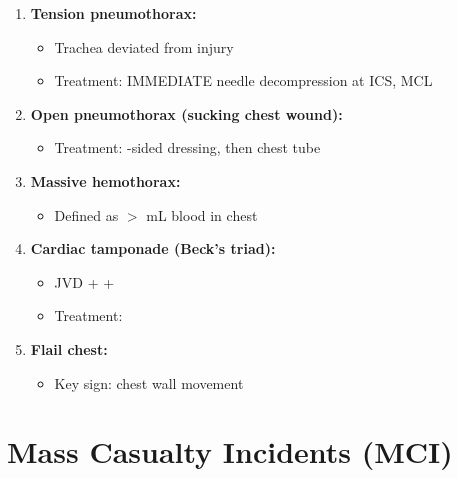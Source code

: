 \documentclass[11pt]{article}
\begin{document}
\begin{enumerate}
    \item \textbf{Tension pneumothorax:}
    \begin{itemize}
        \item Trachea deviated \underline{\hspace{2cm}} from injury
        \item Treatment: IMMEDIATE needle decompression at \underline{\hspace{2cm}} ICS, MCL
    \end{itemize}
    
    \item \textbf{Open pneumothorax (sucking chest wound):}
    \begin{itemize}
        \item Treatment: \underline{\hspace{2cm}}-sided dressing, then chest tube
    \end{itemize}
    
    \item \textbf{Massive hemothorax:}
    \begin{itemize}
        \item Defined as $>$ \underline{\hspace{2cm}} mL blood in chest
    \end{itemize}
    
    \item \textbf{Cardiac tamponade (Beck's triad):}
    \begin{itemize}
        \item JVD + \underline{\hspace{2cm}} + \underline{\hspace{3cm}}
        \item Treatment: \underline{\hspace{3cm}}
    \end{itemize}
    
    \item \textbf{Flail chest:}
    \begin{itemize}
        \item Key sign: \underline{\hspace{3cm}} chest wall movement
    \end{itemize}
\end{enumerate}

\hrulefill

\section{Mass Casualty Incidents (MCI)}
\end{document}
